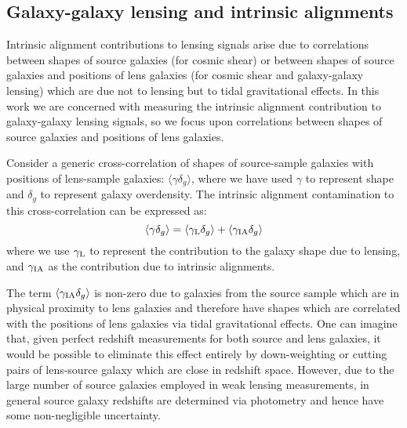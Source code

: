 \documentclass[a4paper,fleqn,usenatbib]{mnras}
\begin{document}
\subsection{Galaxy-galaxy lensing and intrinsic alignments}
\label{subsec:ggl_and_ia}
\noindent
Intrinsic alignment contributions to lensing signals arise due to correlations between shapes of source galaxies (for cosmic shear) or between shapes of source galaxies and positions of lens galaxies (for cosmic shear and galaxy-galaxy lensing) which are due not to lensing but to tidal gravitational effects. In this work we are concerned with measuring the intrinsic alignment contribution to galaxy-galaxy lensing signals, so we focus upon correlations between shapes of source galaxies and positions of lens galaxies. 

Consider a generic cross-correlation of shapes of source-sample galaxies with positions of lens-sample galaxies: $\langle \gamma \delta_g \rangle$, where we have used $\gamma$ to represent shape and $\delta_g$ to represent galaxy overdensity. The intrinsic alignment contamination to this cross-correlation can be expressed as:
\begin{equation}
\langle \gamma \delta_g \rangle = \langle \gamma_{\rm L} \delta_g \rangle + \langle \gamma_{\rm IA} \delta_g \rangle
\label{GGL_IA}
\end{equation}
where we use $\gamma_{\rm L}$ to represent the contribution to the galaxy shape due to lensing, and $\gamma_{\rm IA}$ as the contribution due to intrinsic alignments.

The term $\langle \gamma_{\rm IA} \delta_g \rangle$ is non-zero due to galaxies from the source sample which are in physical proximity to lens galaxies and therefore have shapes which are correlated with the positions of lens galaxies via tidal gravitational effects. One can imagine that, given perfect redshift measurements for both source and lens galaxies, it would be possible to eliminate this effect entirely by down-weighting or cutting pairs of lens-source galaxy which are close in redshift space. However, due to the large number of source galaxies employed in weak lensing measurements, in general source galaxy redshifts are determined via photometry and hence have some non-negligible uncertainty.
\end{document}
